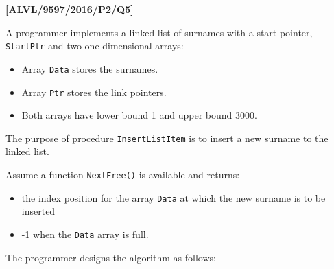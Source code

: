 \item \textbf{{[}ALVL/9597/2016/P2/Q5{]} }

A programmer implements a linked list of surnames with a start pointer,
\texttt{StartPtr} and two one-dimensional arrays: 
\begin{itemize}
\item Array \texttt{Data} stores the surnames. 
\item Array \texttt{Ptr} stores the link pointers.
\item Both arrays have lower bound 1 and upper bound 3000. 
\end{itemize}
The purpose of procedure \texttt{InsertListItem} is to insert a new
surname to the linked list. 

Assume a function \texttt{NextFree()} is available and returns: 
\begin{itemize}
\item the index position for the array \texttt{Data} at which the new surname
is to be inserted 
\item -1 when the \texttt{Data} array is full. 
\end{itemize}
The programmer designs the algorithm as follows:

